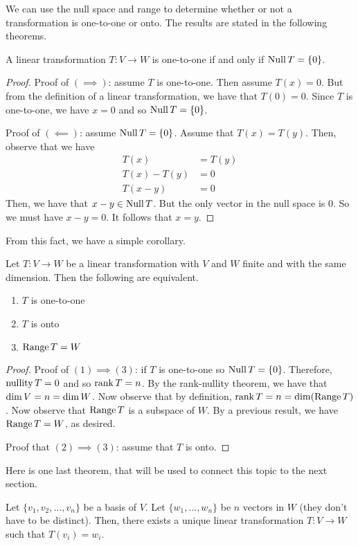 \documentclass[main.tex]{subfiles}
\begin{document}
    We can use the null space and range to determine whether or not a transformation is one-to-one or onto. The results are stated in the following theorems. 
    \begin{thrm}{}{}
        A linear transformation $T: V\to W$ is one-to-one if and only if $\operatorname{Null} T = \{0\}$. 
    \end{thrm}
    \begin{proof}
        Proof of $(\implies)$: assume $T$ is one-to-one. Then assume $T(x) = 0$. But from the definition of a linear transformation, we have that $T(0)=0$. Since $T$ is one-to-one, we have $x=0$ and so $\operatorname{Null} T = \{0\}$. \bigbreak 

        \noindent Proof of $(\impliedby)$: assume $\operatorname{Null} T = \{0\}$. Assume that $T(x) = T(y)$. Then, observe that we have 
        \begin{align*}
            T(x) &= T(y) \\
            T(x) - T(y) &= 0 \\
            T(x - y) &= 0 
        \end{align*}
        Then, we have that $x-y\in \operatorname{Null} T$. But the only vector in the null space is $0$. So we must have $x-y=0$. It follows that $x=y$.
    \end{proof}

    From this fact, we have a simple corollary. 
    \begin{cor}{}{}
        Let $T: V\to W$ be a linear transformation with $V$ and $W$ finite and with the same dimension. Then the following are equivalent. 
        \begin{enumerate}
            \item $T$ is one-to-one 
            \item $T$ is onto 
            \item $\operatorname{Range} T = W$
        \end{enumerate}
    \end{cor}
    \begin{proof}
        Proof of $(1)\implies (3)$: if $T$ is one-to-one so $\operatorname{Null} T = \{0\}$. Therefore, $\operatorname{nullity} T = 0$ and so $\operatorname{rank} T = n$. By the rank-nullity theorem, we have that $\operatorname{dim} V = n = \operatorname{dim} W$. Now observe that by definition, $\operatorname{rank} T = n = \operatorname{dim} (\operatorname{Range} T)$. Now observe that $\operatorname{Range} T$ is a subspace of $W$. By a previous result, we have $\operatorname{Range} T = W$, as desired. \bigbreak

        \noindent Proof that $(2) \implies (3)$: assume that $T$ is onto. 
    \end{proof}

    Here is one last theorem, that will be used to connect this topic to the next section. 
    \begin{thrm}{}{}
        Let $\{v_1, v_2, ..., v_n\}$ be a basis of $V$. Let $\{w_1, ..., w_n\}$ be $n$ vectors in $W$ (they don't have to be distinct). Then, there exists a unique linear transformation $T: V\to W$ such that $T(v_i) = w_i$.
    \end{thrm}
\end{document}
